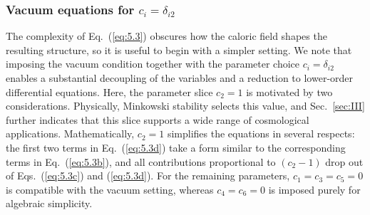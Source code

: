\documentclass[aps,prd,twocolumn]{revtex4-2}
\begin{document}
\subsubsection{Vacuum equations for $c_i=\delta_{i2}$}
The complexity of Eq.~(\ref{eq:5.3}) obscures how the caloric field shapes the resulting structure, so it is useful to begin with a simpler setting. We note that imposing the vacuum condition together with the parameter choice $c_i=\delta_{i2}$ enables a substantial decoupling of the variables and a reduction to lower-order differential equations. Here, the parameter slice $c_2=1$ is motivated by two considerations. Physically, Minkowski stability selects this value, and Sec.~\ref{sec:III} further indicates that this slice supports a wide range of cosmological applications. Mathematically, $c_2=1$ simplifies the equations in several respects: the first two terms in Eq.~(\ref{eq:5.3d}) take a form similar to the corresponding terms in Eq.~(\ref{eq:5.3b}), and all contributions proportional to $(c_2-1)$ drop out of Eqs.~(\ref{eq:5.3c}) and (\ref{eq:5.3d}). For the remaining parameters, $c_1=c_3=c_5=0$ is compatible with the vacuum setting, whereas $c_4=c_6=0$ is imposed purely for algebraic simplicity.
\end{document}
